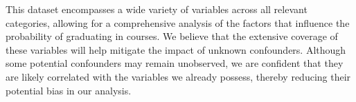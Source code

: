 \documentclass[12pt]{article}
\begin{document}
This dataset encompasses a wide variety of variables across all relevant categories, allowing for a comprehensive analysis of the factors that influence the probability of graduating in courses. We believe that the extensive coverage of these variables will help mitigate the impact of unknown confounders. Although some potential confounders may remain unobserved, we are confident that they are likely correlated with the variables we already possess, thereby reducing their potential bias in our analysis.
\end{document}

